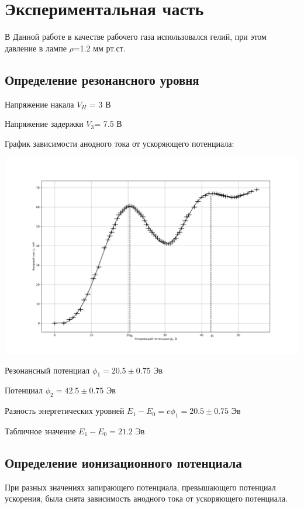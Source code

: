 \newpage
\section{Экспериментальная часть}

В Данной работе в качестве рабочего газа использовался гелий, при этом давление в лампе $\rho$=1.2 мм рт.ст.
\subsection{Определение резонансного уровня}

Напряжение накала $V_H$ = 3 В

Напряжение задержки $V_3$= 7.5 В

График зависимости анодного тока от ускоряющего потенциала:

\begin{minipage}{\linewidth}
    \centering
    \includegraphics[width=\linewidth]{fig/1.png}    
\end{minipage}

Резонансный потенциал $\phi_1=20.5\pm 0.75$ Эв

Потенциал $\phi_2=42.5 \pm 0.75$ Эв

Разность энергетических уровней $E_1-E_0=e\phi_1=20.5\pm 0.75$ Эв

Табличное значение $E_1-E_0=21.2$ Эв
\subsection{Определение ионизационного потенциала}
 При разных значениях запирающего потенциала, превышающего потенциал ускорения, была снята зависимость анодного тока от
  ускоряющего потенциала. 

